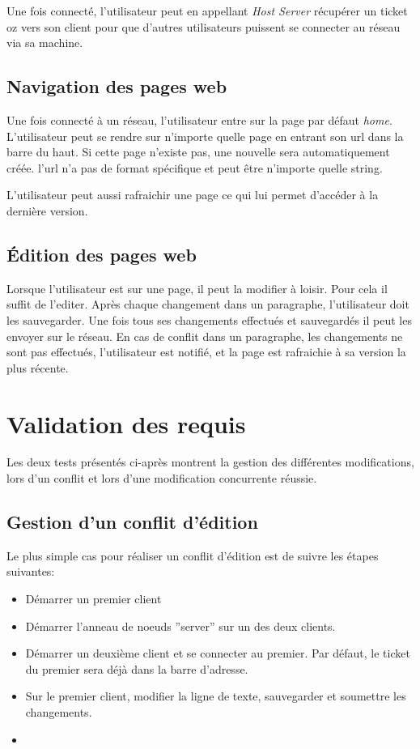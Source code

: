 \documentclass{article}
\begin{document}
	Une fois connecté, l'utilisateur peut en appellant \emph{Host Server}
	récupérer un ticket oz vers son client pour que d'autres utilisateurs
	puissent se connecter au réseau via sa machine. 
	
	\subsection{Navigation des pages web}
	Une fois connecté à un réseau, l'utilisateur entre sur la page par défaut
	\emph{home}. L'utilisateur peut se rendre sur n'importe quelle page en
	entrant son url dans la barre du haut. Si cette page n'existe pas, 
	une nouvelle sera automatiquement créée. l'url n'a pas de format spécifique
	et peut être n'importe quelle string. 
	
	L'utilisateur peut aussi rafraichir une page ce qui lui permet d'accéder
	à la dernière version.
	
	\subsection{Édition des pages web}
	Lorsque l'utilisateur est sur une page, il peut la modifier à loisir.
	Pour cela il suffit de l'editer. Après chaque changement dans un paragraphe,
	l'utilisateur doit les sauvegarder. Une fois tous ses changements
	effectués et sauvegardés il peut les envoyer sur le réseau. En cas
	de conflit dans un paragraphe, les changements ne sont pas effectués,
	l'utilisateur est notifié, et la page est rafraichie à sa version la plus
	récente. 
	
	\section{Validation des requis}
	Les deux tests présentés ci-après montrent la gestion des différentes modifications,
	lors d'un conflit et lors d'une modification concurrente réussie.
	
	\subsection{Gestion d'un conflit d'édition}
	Le plus simple cas pour réaliser un conflit d'édition est de suivre les étapes suivantes:
	\begin{itemize}
		\item Démarrer un premier client
		\item Démarrer l'anneau de noeuds ''server'' sur un des deux clients.
		\item Démarrer un deuxième client et se connecter au premier.  Par défaut, le ticket
			du premier sera déjà dans la barre d'adresse.
		\item Sur le premier client, modifier la ligne de texte, sauvegarder et soumettre les
			changements.
		\item 	
	\end{itemize}
	
\end{document}
